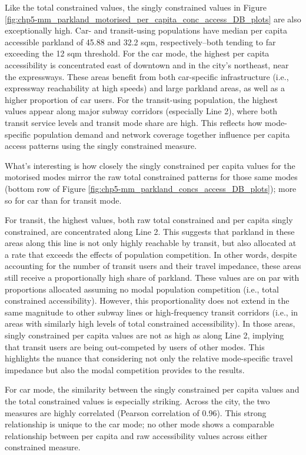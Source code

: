 \documentclass[
11pt, %
oneside, %
english, %
singlespacing, %
]{macthesis} %
\begin{document}
Like the total constrained values, the singly constrained values in Figure \ref{fig:chp5-mm_parkland_motorised_per_capita_conc_access_DB_plots} are also exceptionally high. Car- and transit-using populations have median per capita accessible parkland of 45.88 and 32.2 sqm, respectively--both tending to far exceeding the 12 sqm threshold. For the car mode, the highest per capita accessibility is concentrated east of downtown and in the city's northeast, near the expressways. These areas benefit from both car-specific infrastructure (i.e., expressway reachability at high speeds) and large parkland areas, as well as a higher proportion of car users. For the transit-using population, the highest values appear along major subway corridors (especially Line 2), where both transit service levels and transit mode share are high. This reflects how mode-specific population demand and network coverage together influence per capita access patterns using the singly constrained measure.

What's interesting is how closely the singly constrained per capita values for the motorised modes mirror the raw total constrained patterns for those same modes (bottom row of Figure \ref{fig:chp5-mm_parkland_concs_access_DB_plots}); more so for car than for transit mode.

For transit, the highest values, both raw total constrained and per capita singly constrained, are concentrated along Line 2. This suggests that parkland in these areas along this line is not only highly reachable by transit, but also allocated at a rate that exceeds the effects of population competition. In other words, despite accounting for the number of transit users and their travel impedance, these areas still receive a proportionally high share of parkland. These values are on par with proportions allocated assuming no modal population competition (i.e., total constrained accessibility). However, this proportionality does not extend in the same magnitude to other subway lines or high-frequency transit corridors (i.e., in areas with similarly high levels of total constrained accessibility). In those areas, singly constrained per capita values are not as high as along Line 2, implying that transit users are being out-competed by users of other modes. This highlights the nuance that considering not only the relative mode-specific travel impedance but also the modal competition provides to the results.

For car mode, the similarity between the singly constrained per capita values and the total constrained values is especially striking. Across the city, the two measures are highly correlated (Pearson correlation of 0.96). This strong relationship is unique to the car mode; no other mode shows a comparable relationship between per capita and raw accessibility values across either constrained measure.
\end{document}
